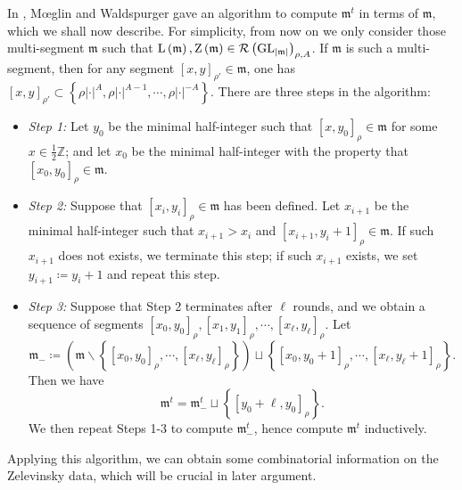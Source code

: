 \documentclass[11pt,letterpaper]{amsart}
\theoremstyle{plain}
\numberwithin{theorem}{section}
\numberwithin{equation}{subsection}
\theoremstyle{remark}
\newcommand{\GL}{\operatorname{GL}}
\newcommand{\Z}{\mathbb{Z}}
\def\calR{\mathcal{R}}
\begin{document}
\vskip 5pt

In \cite{MR863522}, M{\oe}glin and Waldspurger gave an algorithm to compute $\mathfrak{m}^t$ in terms of $\mathfrak{m}$, which we shall now describe. For simplicity, from now on we only consider those multi-segment $\mathfrak{m}$ such that ${\rm L}\left(\mathfrak{m}\right), {\rm Z}\left(\mathfrak{m}\right)\in\calR\left(\GL_{|\mathfrak{m}|}\right)_{\rho,A}$. If $\mathfrak{m}$ is such a multi-segment, then for any segment $\left[x,y\right]_{\rho'}\in\mathfrak{m}$, one has $\left[x,y\right]_{\rho'} \subset \left\{\rho|\cdot|^A, \rho|\cdot|^{A-1},\cdots,\rho|\cdot|^{-A}\right\}$. There are three steps in the algorithm:

\vskip 5pt

\begin{itemize}
    \item[-] \emph{Step 1:} Let $y_0$ be the minimal half-integer such that $\left[x,y_0\right]_\rho\in\mathfrak{m}$ for some $x\in\frac{1}{2}\Z$; and let $x_0$ be the minimal half-integer with the property that $\left[x_0,y_0\right]_\rho\in\mathfrak{m}$.

    \vskip 5pt

    \item[-] \emph{Step 2:} Suppose that $\left[x_i,y_i\right]_\rho\in\mathfrak{m}$ has been defined. Let $x_{i+1}$ be the minimal half-integer such that $x_{i+1}>x_i$ and $\left[x_{i+1},y_i+1\right]_\rho\in\mathfrak{m}$. If such $x_{i+1}$ does not exists, we terminate this step; if such $x_{i+1}$ exists, we set $y_{i+1}\coloneqq y_i+1$ and repeat this step.

    \vskip 5pt

    \item[-] \emph{Step 3:} Suppose that Step 2 terminates after $\ell$ rounds, and we obtain a sequence of segments $\left[x_0,y_0\right]_\rho, \left[x_1,y_1\right]_\rho, \cdots, \left[x_\ell,y_\ell\right]_\rho$. Let
    \[
        \mathfrak{m}_-\coloneqq \left(\mathfrak{m}\backslash\left\{\left[x_0,y_0\right]_\rho, \cdots, \left[x_\ell,y_\ell\right]_\rho\right\}\right)\sqcup\left\{\left[x_0,y_0+1\right]_\rho, \cdots, \left[x_\ell,y_\ell+1\right]_\rho\right\}.
    \]
    Then we have
    \[
        \mathfrak{m}^t = \mathfrak{m}_-^t \sqcup \left\{\left[y_0+\ell,y_0\right]_\rho\right\}.
    \]
    We then repeat Steps 1-3 to compute $\mathfrak{m}_-^t$, hence compute $\mathfrak{m}^t$ inductively.
\end{itemize}
\vskip 5pt
Applying this algorithm, we can obtain some combinatorial information on the Zelevinsky data, which will be crucial in later argument.
\end{document}

